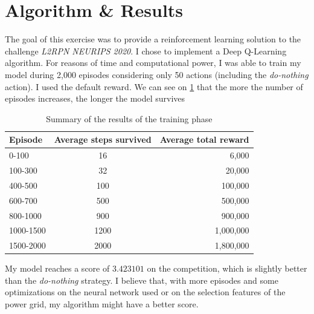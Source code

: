 \documentclass[a4paper]{article}
\begin{document}
\section{Algorithm \& Results}
The goal of this exercise was to provide a reinforcement learning solution to the challenge
\textit{L2RPN NEURIPS 2020}\cite{L2RPN}. I chose to implement a Deep Q-Learning algorithm.
For reasons of time and computational power, I was able to train my model during 2,000 episodes
considering only 50 actions (including the \textit{do-nothing} action). I used the default reward.
We can see on \ref{table:results} that the more the number of episodes increases, the longer the model survives
\begin{table}[H]
  \centering
  \begin{tabular}{|l|c|r|}
    \hline
    Episode & Average steps survived & Average total reward \\
    \hline
    0-100 & 16 & 6,000 \\
    \hline
    100-300 & 32 & 20,000 \\
    \hline
    400-500 & 100 & 100,000\\
    \hline
    600-700 & 500 & 500,000\\
    \hline
    800-1000 & 900 & 900,000\\
    \hline
    1000-1500 & 1200 & 1,000,000\\
    \hline
    1500-2000 & 2000 & 1,800,000\\
    \hline
  \end{tabular}
  \caption{Summary of the results of the training phase}
  \label{table:results}
\end{table}

My model reaches a score of $3.423101$ on the competition, which is slightly better than the \textit{do-nothing}
strategy. I believe that, with more episodes and some optimizations on the neural network
used or on the selection features of the power grid, my algorithm might have a better score.
\end{document}
